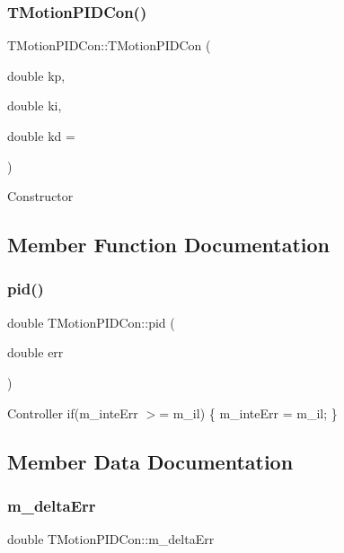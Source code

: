 \subsubsection{\texorpdfstring{T\+Motion\+P\+I\+D\+Con()}{TMotionPIDCon()}}
{\footnotesize\ttfamily T\+Motion\+P\+I\+D\+Con\+::\+T\+Motion\+P\+I\+D\+Con (\begin{DoxyParamCaption}\item[{double}]{kp,  }\item[{double}]{ki,  }\item[{double}]{kd = {} }\end{DoxyParamCaption})\hspace{0.3cm}{\ttfamily [inline]}}

Constructor 

\subsection{Member Function Documentation}
\mbox{\label{structTMotionPIDCon_a138ff107e0fece2fd74a1fed606261ae}} 
\subsubsection{\texorpdfstring{pid()}{pid()}}
{\footnotesize\ttfamily double T\+Motion\+P\+I\+D\+Con\+::pid (\begin{DoxyParamCaption}\item[{double}]{err }\end{DoxyParamCaption})\hspace{0.3cm}{\ttfamily [inline]}}

Controller if(m\+\_\+inte\+Err $>$= m\+\_\+il) \{ m\+\_\+inte\+Err = m\+\_\+il; \} 

\subsection{Member Data Documentation}
\mbox{\label{structTMotionPIDCon_a70da1dcf5bae866184f047980ef4eae2}} 
\subsubsection{\texorpdfstring{m\+\_\+delta\+Err}{m\_deltaErr}}
{\footnotesize\ttfamily double T\+Motion\+P\+I\+D\+Con\+::m\+\_\+delta\+Err}

